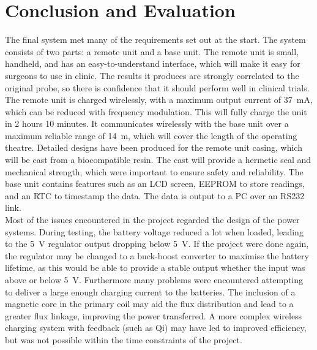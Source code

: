 \section{Conclusion and Evaluation}
The final system met many of the requirements set out at the start. The system consists of two parts: a remote unit and a base unit. The remote unit is small, handheld, and has an easy-to-understand interface, which will make it easy for surgeons to use in clinic. The results it produces are strongly correlated to the original probe, so there is confidence that it should perform well in clinical trials. The remote unit is charged wirelessly, with a maximum output current of \SI{37}{\milli\ampere}, which can be reduced with frequency modulation. This will fully charge the unit in 2 hours 10 minutes. It communicates wirelessly with the base unit over a maximum reliable range of \SI{14}{\metre}, which will cover the length of the operating theatre. Detailed designs have been produced for the remote unit casing, which will be cast from a biocompatible resin. The cast will provide a hermetic seal and mechanical strength, which were important to ensure safety and reliability. The base unit contains features such as an LCD screen, EEPROM to store readings, and an RTC to timestamp the data. The data is output to a PC over an RS232 link.\\


Most of the issues encountered in the project regarded the design of the power systems. During testing, the battery voltage reduced a lot when loaded, leading to the \SI{5}{\volt} regulator output dropping below \SI{5}{\volt}. If the project were done again, the regulator may be changed to a buck-boost converter to maximise the battery lifetime, as this would be able to provide a stable output whether the input was above or below \SI{5}{\volt}. Furthermore many problems were encountered attempting to deliver a large enough charging current to the batteries. The inclusion of a magnetic core in the primary coil may aid the flux distribution and lead to a greater flux linkage, improving the power transferred. A more complex wireless charging system with feedback (such as Qi) may have led to improved efficiency, but was not possible within the time constraints of the project.\\

